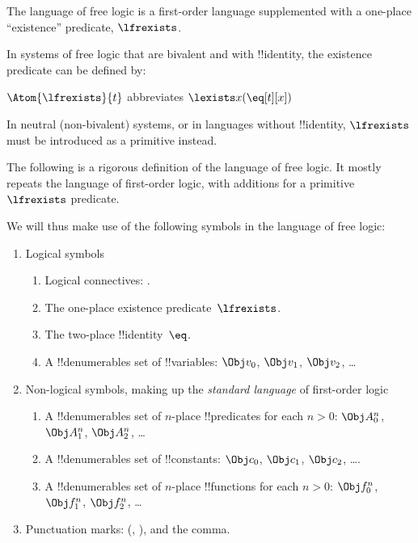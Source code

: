\documentclass[../../../include/open-logic-section]{subfiles}
\begin{document}


The language of free logic is a first-order language supplemented with a 
one-place ``existence'' predicate, $\lfrexists$.

In systems of free logic that are bivalent and with !!{identity}, the 
existence predicate can be defined by:

\begin{defn}
$\Atom{\lfrexists}{t}$ abbreviates $\lexists x (\eq[t][x])$
\end{defn}

In neutral (non-bivalent) systems, or in languages without !!{identity}, 
$\lfrexists$ must be introduced as a primitive instead.

The following is a rigorous definition of the language of free logic. It mostly
repeats the language of first-order logic, with additions for a 
primitive $\lfrexists$ predicate.

We will thus make use of the following symbols in the language of 
free logic: 

\begin{enumerate}
\item Logical symbols
\begin{enumerate}
\item Logical connectives:
  \startycommalist
  .
\item The one-place existence predicate~$\lfrexists$.
\item The two-place !!{identity}~$\eq$.
\item A !!{denumerable}s set of !!{variable}s: $\Obj v_0$, $\Obj v_1$, $\Obj
  v_2$, \dots
\end{enumerate}
\item Non-logical symbols, making up the \emph{standard
  language} of first-order logic
\begin{enumerate}
\item A !!{denumerable}s set of $n$-place !!{predicate}s for each $n>0$: $\Obj
  A^n_0$, $\Obj A^n_1$, $\Obj A^n_2$, \dots
\item A !!{denumerable}s set of !!{constant}s: $\Obj c_0$, $\Obj c_1$, $\Obj
  c_2$, \dots.
\item A !!{denumerable}s set of $n$-place !!{function}s for each $n>0$:
  $\Obj f^n_0$, $\Obj f^n_1$, $\Obj f^n_2$, \dots
\end{enumerate}
\item Punctuation marks: (, ), and the comma.
\end{enumerate}
\end{document}
